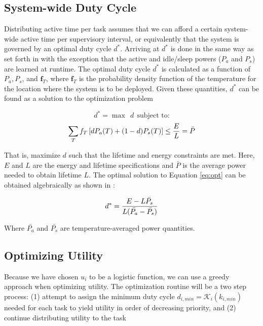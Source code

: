 \subsection{System-wide Duty Cycle}
Distributing active time per task assumes that we can afford a certain system-wide active time per supervisory interval, or equivalently that the system is governed by an optimal duty cycle $d^*$.  Arriving at $d^*$ is done in the same way as set forth in \cite{wanner2011} with the exception that the active and idle/sleep powers ($P_a$ and $P_s$) are learned at runtime.  The optimal duty cycle $d^*$ is calculated as a function of $P_a, P_s$, and $\pmb{f}_T$, where $\pmb{f}_T$ is the probability density function of the temperature for the location where the system is to be deployed. Given these quantities, $d^*$ can be found as a solution to the optimization problem

$$
d^* = \max ~~{d}~~\text{subject to:}
$$
\begin{equation}
\sum_Tf_T\left[dP_a(T) + (1-d)P_s(T)\right] \le {E\over L} = \bar{P}
\label{eq:opt}
\end{equation}

That is, maximize $d$ such that the lifetime and energy constraints are met.  Here, $E$ and $L$ are the energy and lifetime specifications and $\bar{P}$ is the average power needed to obtain lifetime $L$. The optimal solution to Equation \ref{eq:opt} can be obtained algebraically as shown in \cite{wanner2011}:

\begin{equation}
d^* =  { E - L\bar{P_s} \over L(\bar{P_a} -\bar{P_s}) } 
\end{equation}

Where $\bar{P_a}$ and $\bar{P_s}$ are temperature-averaged power quantities. 

\subsection{Optimizing Utility}
Because we have chosen $u_i$ to be a logistic function, we can use a greedy approach when optimizing utility.  The optimization routine will be a two step process: (1) attempt to assign the minimum duty cycle $d_{i,min} = \mathcal{K}_i(k_{i,min})$ needed for each task to yield utility in order of decreasing priority, and (2) continue distributing utility to the task 


